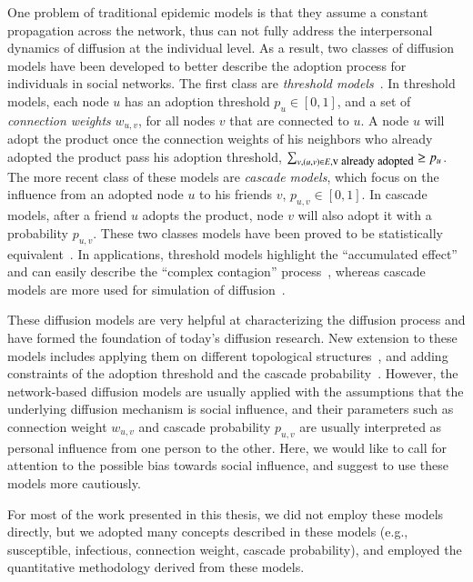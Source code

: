 \documentclass[phd,tocprelim]{cornell}
\begin{document}
One problem of traditional epidemic models is that they assume a constant propagation across the network, thus can not fully address the interpersonal dynamics of diffusion at the individual level. As a result, two classes of diffusion models have been developed to better describe the adoption process for individuals in social networks. The first class are \emph{threshold models}~\cite{Granovetter:1978}. In threshold models, each node $u$ has an adoption threshold $p_u \in [0,1]$, and a set of \emph{connection weights} $w_{u,v}$, for all nodes $v$ that are connected to $u$. A node $u$ will adopt the product once the connection weights of his neighbors who already adopted the product pass his adoption threshold, $\sum_{v, (u,v)\in E,  \textnormal{\small v already adopted}} \ge p_u$. The more recent class of these models are \emph{cascade models}, which focus on the influence from an adopted node $u$ to his friends $v$, $p_{u,v} \in [0,1]$. In cascade models, after a friend $u$ adopts the product, node $v$ will also adopt it with a probability $p_{u,v}$. These two classes models have been proved to be statistically equivalent~\cite{Goldenberg:2001,Kempe-2003}. In applications, threshold models highlight the ``accumulated effect'' and can easily describe the ``complex contagion'' process~\cite{Centola:2007}, whereas cascade models are more used for simulation of diffusion~\cite{Goldenberg:2001}.

These diffusion models are very helpful at characterizing the diffusion process and have formed the foundation of today's diffusion research. New extension to these models includes applying them on different topological structures~\cite{pastor-satorras01,Eguiluz-2002,Dodds:2005}, and adding constraints of the adoption threshold and the cascade probability~\cite{wu-2004}. However, the network-based diffusion models are usually applied with the assumptions that the underlying diffusion mechanism is social influence, and their parameters such as connection weight $w_{u,v}$ and cascade probability $p_{u,v}$ are usually interpreted as personal influence from one person to the other. Here, we would like to call for attention to the possible bias towards social influence, and suggest to use these models more cautiously.

For most of the work presented in this thesis, we did not employ these models directly, but we adopted many concepts described in these models (e.g., susceptible, infectious, connection weight, cascade probability), and employed the quantitative methodology derived from these models.
\end{document}
